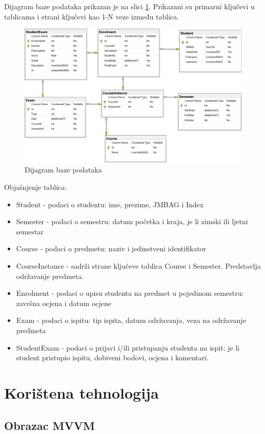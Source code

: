 \documentclass[times, utf8, diplomski]{fer}
\begin{document}
Dijagram baze podataka prikazan je na slici \ref{fig:baza}. Prikazani su primarni ključevi u tablicama i strani ključevi kao 1-N veze između tablica.
\begin{figure}[htb]
\centering
\includegraphics[width=12cm]{database_diagram3.png}
\caption{Dijagram baze podataka}
\label{fig:baza}
\end{figure}

Objašnjenje tablica:
\begin{itemize}
    \item Student - podaci o studentu: ime, prezime, JMBAG i Index
    \item Semester - podaci o semestru: datum početka i kraja, je li zimski ili ljetni semestar
    \item Course - podaci o predmetu: naziv i jedinstveni identifikator 
    \item CourseInstance - sadrži strane ključeve tablica Course i Semester. Predstavlja održavanje predmeta.
    \item Enrolment - podaci o upisu studenta na predmet u pojedinom semestru: završna ocjena i datum ocjene
    \item Exam - podaci o ispitu: tip ispita, datum održavanja, veza na održavanje predmeta
    \item StudentExam - podaci o prijavi i/ili pristupanju studenta na ispit: je li student pristupio ispitu, dobiveni bodovi, ocjena i komentari.
\end{itemize}{}

\section{Korištena tehnologija}
\subsection{Obrazac MVVM}
\end{document}
